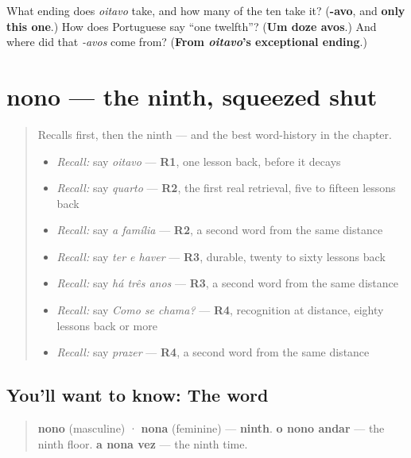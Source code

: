 \begin{tcolorbox}[breakable,colback=teal!4,colframe=teal!35!black,title={Before you move on}]
What ending does \emph{oitavo} take, and how many of the ten take it? (\textbf{-avo}, and \textbf{only this one}.) How does Portuguese say \textquotedblleft{}one twelfth\textquotedblright{}? (\textbf{Um doze avos}.) And where did that \emph{-avos} come from? (\textbf{From \emph{oitavo}'s exceptional ending}.)
\end{tcolorbox}
\section[nono / nona]{nono — the ninth, squeezed shut}

\label{lesson:PT-C28-nono}



\begin{quote}
Recalls first, then the ninth — and the best word-history in the chapter.

\begin{itemize}
\raggedright
  \item \emph{Recall:} say \emph{oitavo} — \textbf{R1}, one lesson back, before it decays
  \item \emph{Recall:} say \emph{quarto} — \textbf{R2}, the first real retrieval, five to fifteen lessons back
  \item \emph{Recall:} say \emph{a família} — \textbf{R2}, a second word from the same distance
  \item \emph{Recall:} say \emph{ter e haver} — \textbf{R3}, durable, twenty to sixty lessons back
  \item \emph{Recall:} say \emph{há três anos} — \textbf{R3}, a second word from the same distance
  \item \emph{Recall:} say \emph{Como se chama?} — \textbf{R4}, recognition at distance, eighty lessons back or more
  \item \emph{Recall:} say \emph{prazer} — \textbf{R4}, a second word from the same distance
\end{itemize}
\end{quote}

\subsection*{You'll want to know: The word}
\begin{quote}
\textbf{nono} (masculine) · \textbf{nona} (feminine) — \textbf{ninth}. \textbf{o nono andar} — the ninth floor. \textbf{a nona vez} — the ninth time.
\end{quote}

